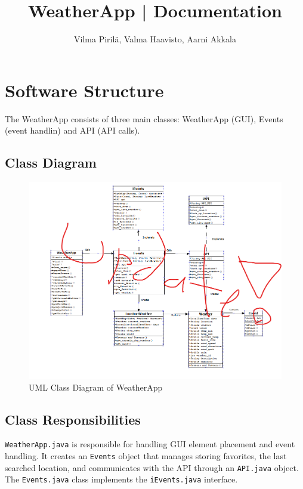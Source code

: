 \documentclass[a4paper,12pt]{article}
\begin{document}
\title{WeatherApp | Documentation}
\author{Vilma Pirilä, Valma Haavisto, Aarni Akkala}

\maketitle

\section{Software Structure}

The WeatherApp consists of three main classes: WeatherApp (GUI), Events (event handlin) and API (API calls). 

\subsection{Class Diagram}

\begin{figure}[h]
    \centering
    \includegraphics[width=1\textwidth]{class_diagram.png}
    \caption{UML Class Diagram of WeatherApp}
    \label{fig:class_diagram}
\end{figure}

\FloatBarrier

\subsection{Class Responsibilities}


\texttt{WeatherApp.java} is responsible for handling GUI element placement and event handling. It creates an \texttt{Events} object that manages storing favorites, the last searched location, and communicates with the API through an \texttt{API.java} object. The \texttt{Events.java} class implements the \texttt{iEvents.java} interface. 
\end{document}
